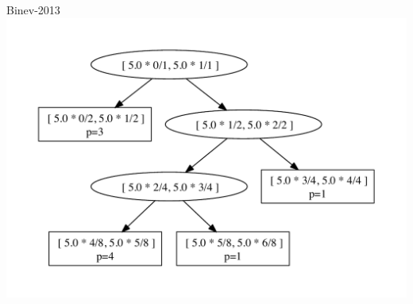 \documentclass{beamer}
\begin{document}
\begin{frame}{Binev-2013}
{  \includegraphics[height=0.5\textheight]{tree_hp_8.pdf}}
\end{frame}
\end{document}
